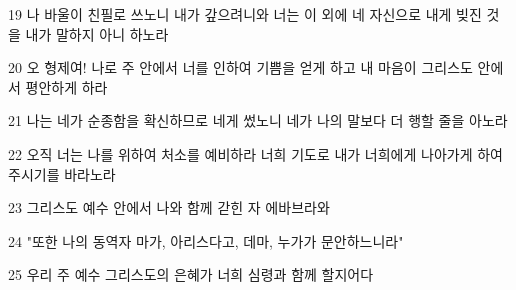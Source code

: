 \par 19 나 바울이 친필로 쓰노니 내가 갚으려니와 너는 이 외에 네 자신으로 내게 빚진 것을 내가 말하지 아니 하노라
\par 20 오 형제여! 나로 주 안에서 너를 인하여 기쁨을 얻게 하고 내 마음이 그리스도 안에서 평안하게 하라
\par 21 나는 네가 순종함을 확신하므로 네게 썼노니 네가 나의 말보다 더 행할 줄을 아노라
\par 22 오직 너는 나를 위하여 처소를 예비하라 너희 기도로 내가 너희에게 나아가게 하여 주시기를 바라노라
\par 23 그리스도 예수 안에서 나와 함께 갇힌 자 에바브라와
\par 24 "또한 나의 동역자 마가, 아리스다고, 데마, 누가가 문안하느니라"
\par 25 우리 주 예수 그리스도의 은혜가 너희 심령과 함께 할지어다


